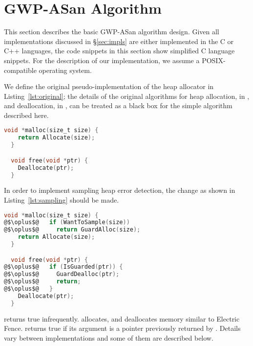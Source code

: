 \section{GWP-ASan Algorithm}
\label{sec:algo}

This section describes the basic GWP-ASan algorithm design. Given all
implementations discussed in \S\ref{sec:impls} are either implemented in the C
or C++ languages, the code snippets in this section show simplified C language
snippets. For the description of our implementation, we assume a
POSIX-compatible operating system.

We define the original pseudo-implementation of the heap allocator in
Listing~\ref{lst:original}; the details of the original algorithms for heap
allocation, in , and deallocation, in
, can be treated as a black box for the simple algorithm
described here.

\begin{lstlisting}[language=C, frame=single, xleftmargin=3em,
  xrightmargin=3em, caption=Unmodified heap allocation., label=lst:original]
  void *malloc(size_t size) {
    return Allocate(size);
  }

  void free(void *ptr) {
    Deallocate(ptr);
  }
\end{lstlisting}

In order to implement sampling heap error detection, the change as shown in
Listing~\ref{lst:sampling} should be made.

\begin{lstlisting}[language=C, frame=single, xleftmargin=3em,
  xrightmargin=3em, caption=Heap allocation with sampling error detection.,
  label=lst:sampling, escapechar=@]
  void *malloc(size_t size) {
@$\oplus$@   if (WantToSample(size))
@$\oplus$@     return GuardAlloc(size);
    return Allocate(size);
  }

  void free(void *ptr) {
@$\oplus$@   if (IsGuarded(ptr)) {
@$\oplus$@     GuardDealloc(ptr);
@$\oplus$@     return;
@$\oplus$@   }
    Deallocate(ptr);
  }
\end{lstlisting}

 returns true infrequently. 
allocates, and  deallocates memory similar to Electric
Fence.   returns true if its argument is a pointer
previously returned by .  Details vary between
implementations and some of them are described below.


